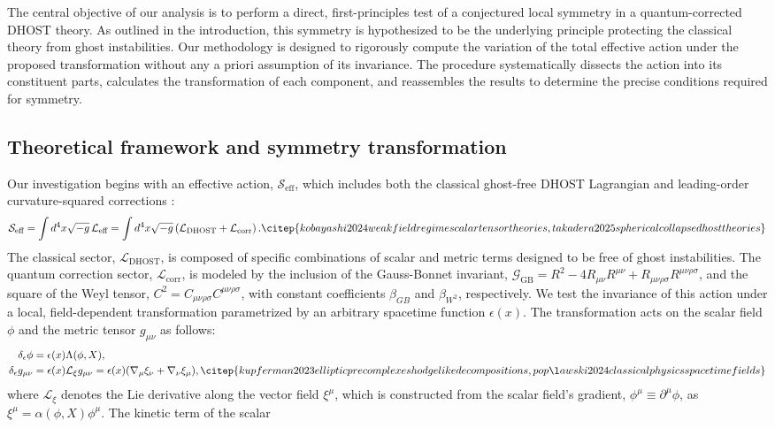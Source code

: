 \documentclass[twocolumn]{aastex631}
\begin{document}
The central objective of our analysis is to perform a direct, first-principles test of a conjectured local symmetry in a quantum-corrected DHOST theory. As outlined in the introduction, this symmetry is hypothesized to be the underlying principle protecting the classical theory from ghost instabilities. Our methodology is designed to rigorously compute the variation of the total effective action under the proposed transformation without any a priori assumption of its invariance. The procedure systematically dissects the action into its constituent parts, calculates the transformation of each component, and reassembles the results to determine the precise conditions required for symmetry.\subsection{Theoretical framework and symmetry transformation}Our investigation begins with an effective action, $\mathcal{S}_{\text{eff}}$, which includes both the classical ghost-free DHOST Lagrangian \citep{nezhad2025degeneratehigherorderscalartensortheories} and leading-order curvature-squared corrections \citep{lambiase2025exorcisingghostsgravitationalwaves}:\begin{equation}\mathcal{S}_{\text{eff}} = \int d^4x \sqrt{-g} \, \mathcal{L}_{\text{eff}} = \int d^4x \sqrt{-g} \left( \mathcal{L}_{\text{DHOST}} + \mathcal{L}_{\text{corr}} \right). \citep{kobayashi2024weakfieldregimescalartensortheories,takadera2025sphericalcollapsedhosttheories}\end{equation}The classical sector, $\mathcal{L}_{\text{DHOST}}$, is composed of specific combinations of scalar and metric terms designed to be free of ghost instabilities. The quantum correction sector, $\mathcal{L}_{\text{corr}}$, is modeled by the inclusion of the Gauss-Bonnet invariant, $\mathcal{G}_{\text{GB}} = R^2 - 4R_{\mu\nu}R^{\mu\nu} + R_{\mu\nu\rho\sigma}R^{\mu\nu\rho\sigma}$, and the square of the Weyl tensor, $C^2 = C_{\mu\nu\rho\sigma}C^{\mu\nu\rho\sigma}$, with constant coefficients $\beta_{GB}$ and $\beta_{W^2}$, respectively. \citep{cheung2017positivitycurvaturesquaredcorrectionsgravity,sucu2025quantumcorrectedthermodynamicsconformalweyl}We test the invariance of this action under a local, field-dependent transformation parametrized by an arbitrary spacetime function $\epsilon(x)$. The transformation acts on the scalar field $\phi$ and the metric tensor $g_{\mu\nu}$ as follows: \citep{jarv2015transformationpropertiesgeneralrelativity,babichev2024generalisationconformaldisformaltransformationsmetric}\begin{align}\delta_\epsilon \phi &= \epsilon(x) \Lambda(\phi, X), \\\delta_\epsilon g_{\mu\nu} &= \epsilon(x) \mathcal{L}_{\xi} g_{\mu\nu} = \epsilon(x) (\nabla_\mu \xi_\nu + \nabla_\nu \xi_\mu),  \citep{kupferman2023ellipticprecomplexeshodgelikedecompositions,popławski2024classicalphysicsspacetimefields}\end{align}where $\mathcal{L}_{\xi}$ denotes the Lie derivative along the vector field $\xi^\mu$, which is constructed from the scalar field's gradient, $\phi^\mu \equiv \partial^\mu\phi$, as $\xi^\mu = \alpha(\phi, X)\phi^\mu$. The kinetic term of the scalar 
\end{document}
